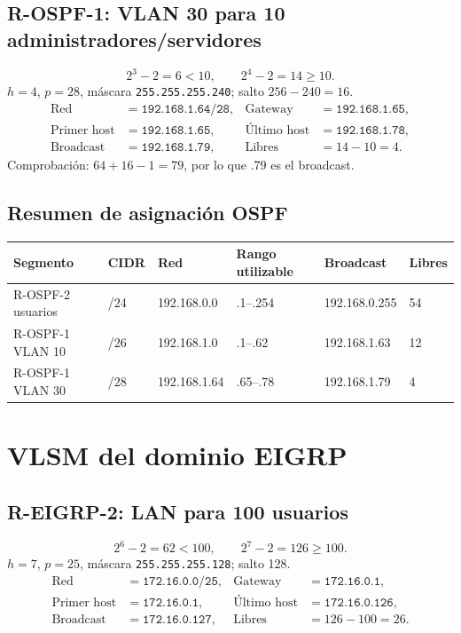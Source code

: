 \documentclass[11pt]{article}
\begin{document}
\subsection{R-OSPF-1: VLAN 30 para 10 administradores/servidores}
\begin{calculo}
\[
2^3-2=6<10,\qquad 2^4-2=14\ge10.
\]
$h=4$, $p=28$, máscara \texttt{255.255.255.240}; salto $256-240=16$.
\begin{align*}
\text{Red} &= \texttt{192.168.1.64/28}, & \text{Gateway} &= \texttt{192.168.1.65},\\
\text{Primer host} &= \texttt{192.168.1.65}, & \text{Último host} &= \texttt{192.168.1.78},\\
\text{Broadcast} &= \texttt{192.168.1.79}, & \text{Libres} &=14-10=4.
\end{align*}
Comprobación: $64+16-1=79$, por lo que .79 es el broadcast.
\end{calculo}

\subsection{Resumen de asignación OSPF}
\begin{center}
\small
\begin{tabularx}{\textwidth}{Y C{1.1cm} l l l C{1.1cm}}
\toprule
Segmento & CIDR & Red & Rango utilizable & Broadcast & Libres\\
\midrule
R-OSPF-2 usuarios & /24 & 192.168.0.0 & .1--.254 & 192.168.0.255 & 54\\
R-OSPF-1 VLAN 10 & /26 & 192.168.1.0 & .1--.62 & 192.168.1.63 & 12\\
R-OSPF-1 VLAN 30 & /28 & 192.168.1.64 & .65--.78 & 192.168.1.79 & 4\\
\bottomrule
\end{tabularx}
\end{center}

\section{VLSM del dominio EIGRP}

\subsection{R-EIGRP-2: LAN para 100 usuarios}
\begin{calculo}
\[
2^6-2=62<100,\qquad 2^7-2=126\ge100.
\]
$h=7$, $p=25$, máscara \texttt{255.255.255.128}; salto 128.
\begin{align*}
\text{Red} &= \texttt{172.16.0.0/25}, & \text{Gateway} &= \texttt{172.16.0.1},\\
\text{Primer host} &= \texttt{172.16.0.1}, & \text{Último host} &= \texttt{172.16.0.126},\\
\text{Broadcast} &= \texttt{172.16.0.127}, & \text{Libres} &=126-100=26.
\end{align*}
\end{calculo}
\end{document}
